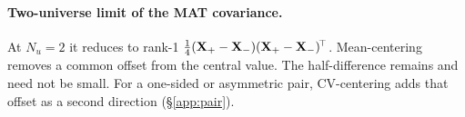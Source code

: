 \paragraph{Two-universe limit of the MAT covariance.} At $N_{u}=2$ it reduces to rank-1 $\tfrac14(\mathbf{X}_{+}-\mathbf{X}_{-})(\mathbf{X}_{+}-\mathbf{X}_{-})^{\!\top}$. Mean-centering removes a common offset from the central value. The half-difference remains and need not be small. For a one-sided or asymmetric pair, CV-centering adds that offset as a second direction (\S\ref{app:pair}).

